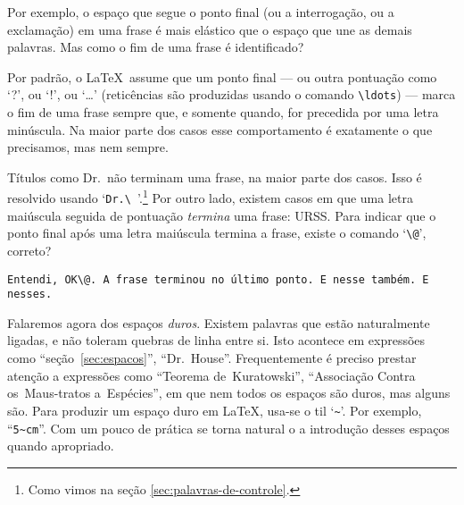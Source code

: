 Por exemplo, o espaço que segue o ponto final (ou a interrogação, ou a exclamação) em uma frase é mais
elástico que o espaço que une as demais palavras. Mas como o fim de
uma frase é identificado?

Por padrão, o \LaTeX\ assume que um ponto final --- ou outra pontuação
como `?{}', ou `!{}', ou `\ldots'
(reticências são produzidas usando o
comando \verb'\ldots') --- marca o fim de uma
frase sempre que, e somente quando, for precedida por uma letra
minúscula. Na maior parte dos casos esse comportamento é exatamente o
que precisamos, mas nem sempre.

Títulos como Dr.\ não terminam uma frase, na maior parte dos
casos. Isso é resolvido usando `\verb*'Dr.\ ''.\footnote{Como vimos na seção \ref{sec:palavras-de-controle}.}
Por outro lado, existem casos em que uma letra maiúscula seguida de
pontuação \emph{termina} uma frase: URSS\@. Para indicar que o ponto
final após uma letra maiúscula termina a frase, existe o comando `\verb'\@'\thinspace', correto?
\begin{center}\footnotesize
\verb'Entendi, OK\@. A frase terminou no último ponto. E nesse também. E nesses.'
\end{center}

Falaremos agora dos espaços \emph{duros}. Existem palavras que estão naturalmente ligadas, e não toleram quebras de linha entre si. Isto acontece em expressões como ``seção~\ref{sec:espacos}'', ``Dr.\ House''. Frequentemente é preciso prestar atenção a expressões como ``Teorema de~Kuratowski'', ``Associação Contra os~Maus-tratos a~Espécies'', em que nem todos os espaços são duros, mas alguns são.
Para produzir um espaço duro em \LaTeX, usa-se o til `\verb'~''. Por exemplo, ``\verb'5~cm'''. Com um pouco de prática se torna natural o a introdução desses espaços quando apropriado.


